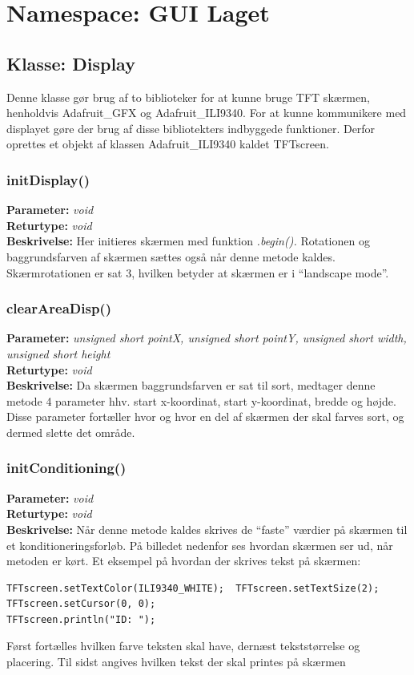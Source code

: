 \section{Namespace: GUI Laget}

\subsection{Klasse: Display}
Denne klasse gør brug af to biblioteker for at kunne bruge TFT skærmen, henholdvis Adafruit\_GFX og Adafruit\_ILI9340. For at kunne kommunikere med displayet gøre der brug af disse bibliotekters indbyggede funktioner. Derfor oprettes et objekt af klassen Adafruit\_ILI9340 kaldet TFTscreen.

\subsubsection{initDisplay()}
\textbf{Parameter: } \textit{void}
\\ \textbf{Returtype: } \textit{void}
\\ \textbf{Beskrivelse: } Her initieres skærmen med funktion \textit{.begin().} Rotationen og baggrundsfarven af skærmen sættes også når denne metode kaldes. Skærmrotationen er sat 3, hvilken betyder at skærmen er i “landscape mode”. 

\subsubsection{clearAreaDisp()}
\textbf{Parameter: } \textit{unsigned short pointX, unsigned short pointY, unsigned short width, unsigned short height}
\\ \textbf{Returtype: } \textit{void}
\\ \textbf{Beskrivelse: } Da skærmen baggrundsfarven er sat til sort, medtager denne metode 4 parameter hhv. start x-koordinat, start y-koordinat, bredde og højde. Disse parameter fortæller hvor og hvor en del af skærmen der skal farves sort, og dermed slette det område.

\subsubsection{initConditioning()}
\textbf{Parameter: } \textit{void}
\\ \textbf{Returtype: } \textit{void}
\\ \textbf{Beskrivelse: } Når denne metode kaldes skrives de “faste” værdier på skærmen til et konditioneringsforløb. På billedet nedenfor ses hvordan skærmen ser ud, når metoden er kørt. Et eksempel på hvordan der skrives tekst på skærmen: 
\begin{lstlisting}
TFTscreen.setTextColor(ILI9340_WHITE);  TFTscreen.setTextSize(2);
TFTscreen.setCursor(0, 0);
TFTscreen.println("ID: ");
\end{lstlisting}
Først fortælles hvilken farve teksten skal have, dernæst tekststørrelse og placering. Til sidst angives hvilken tekst der skal printes på skærmen

